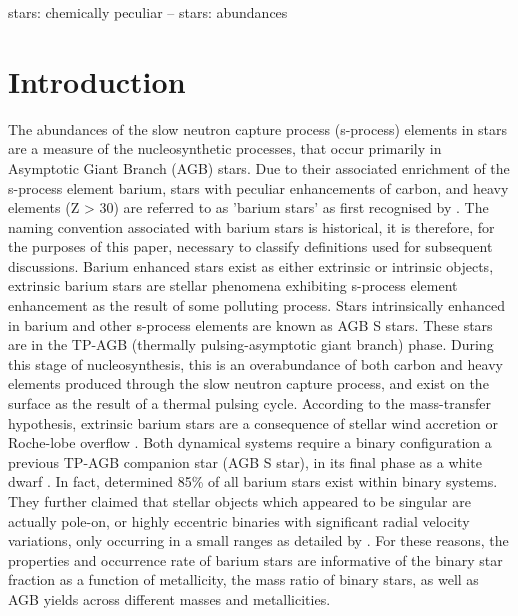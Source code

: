 \documentclass[a4paper,fleqn,usenatbib]{mnras}
\begin{document}
\begin{keywords}
stars: chemically peculiar -- stars: abundances
\end{keywords}

\section{Introduction} \label{sec:intro}

The abundances of the slow neutron capture process (s-process) elements in stars are a measure of the nucleosynthetic processes, that occur primarily in Asymptotic Giant Branch (AGB) stars. Due to their associated enrichment of the s-process element barium, stars with peculiar enhancements of carbon, and heavy elements (Z > 30) are referred to as 'barium stars' as first recognised by \citet{Bidelman1951}. The naming convention associated with barium stars is historical, it is therefore, for the purposes of this paper, necessary to classify definitions used for subsequent discussions. Barium enhanced stars exist as either extrinsic or intrinsic objects, extrinsic barium stars are stellar phenomena exhibiting s-process element enhancement as the result of some polluting process. Stars intrinsically enhanced in barium and other s-process elements are known as AGB S stars. These stars are in the TP-AGB (thermally pulsing-asymptotic giant branch) phase. During this stage of nucleosynthesis, this is an overabundance of both carbon and heavy elements produced through the slow neutron capture process, and exist on the surface as the result of a thermal pulsing cycle. According to the mass-transfer hypothesis, extrinsic barium stars are a consequence of stellar wind accretion \citep{boffin1988,jorissen1992} or Roche-lobe overflow \citep{webbink1986}. Both dynamical systems require a binary configuration a previous TP-AGB companion star (AGB S star), in its final phase as a white dwarf \citep{bohm1980,bohm1984}. In fact, \citet{mcclure1983} determined 85\% of all barium stars exist within binary systems. They further claimed that stellar objects which appeared to be singular are actually pole-on, or highly eccentric binaries with significant radial velocity variations, only occurring in a small ranges as detailed by \citet{pourbaix2004}. For these reasons, the properties and occurrence rate of barium stars are informative of the binary star fraction as a function of metallicity, the mass ratio of binary stars, as well as AGB yields across different masses and metallicities. 
\end{document}
